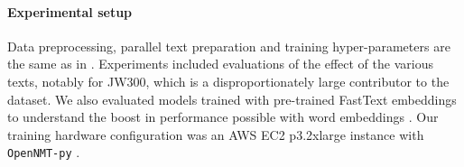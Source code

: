 \documentclass{article} %
\begin{document}

\paragraph{Experimental setup}\label{sec:experimental}
Data preprocessing, parallel text preparation and training hyper-parameters are the same as in \citep{orife2018adr}. Experiments included evaluations of the effect of the various texts, notably for JW300, which is a disproportionately large contributor to the dataset. We also evaluated models trained with pre-trained FastText embeddings to understand the boost in performance possible with word embeddings \citep{alabi2019massive, bojanowski2017enriching}. Our training hardware configuration was an AWS EC2 p3.2xlarge instance with \texttt{OpenNMT-py} \citep{opennmt}.
\end{document}
